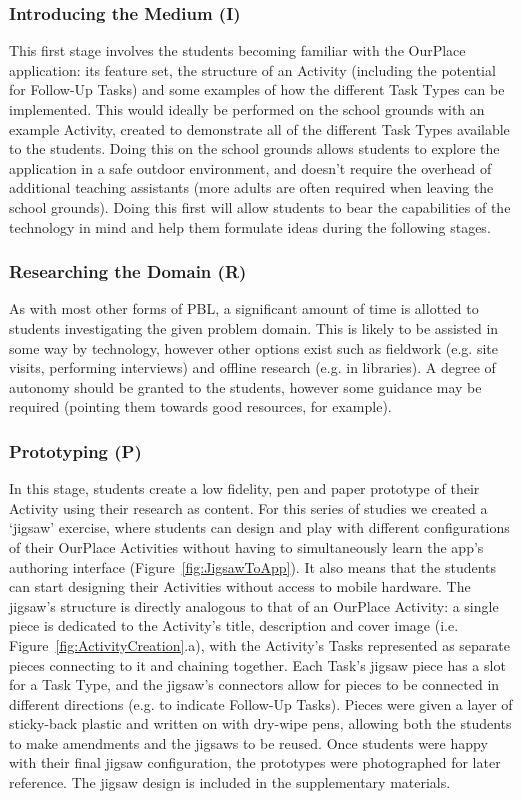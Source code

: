 \documentclass[,hyphens]{sigchi}
\begin{document}
\subsubsection{Introducing the Medium (I)}
This first stage involves the students becoming familiar with the OurPlace application: its feature set, the structure of an Activity (including the potential for Follow-Up Tasks) and some examples of how the different Task Types can be implemented. This would ideally be performed on the school grounds with an example Activity, created to demonstrate all of the different Task Types available to the students. Doing this on the school grounds allows students to explore the application in a safe outdoor environment, and doesn't require the overhead of additional teaching assistants (more adults are often required when leaving the school grounds). Doing this first will allow students to bear the capabilities of the technology in mind and help them formulate ideas during the following stages.

\subsubsection{Researching the Domain (R)}
As with most other forms of PBL, a significant amount of time is allotted to students investigating the given problem domain. This is likely to be assisted in some way by technology, however other options exist such as fieldwork (e.g. site visits, performing interviews) and offline research (e.g. in libraries). A degree of autonomy should be granted to the students, however some guidance may be required (pointing them towards good resources, for example).

\subsubsection{Prototyping (P)}
In this stage, students create a low fidelity, pen and paper prototype of their Activity using their research as content. For this series of studies we created a `jigsaw' exercise, where students can design and play with different configurations of their OurPlace Activities without having to simultaneously learn the app's authoring interface (Figure~\ref{fig:JigsawToApp}). It also means that the students can start designing their Activities without access to mobile hardware. The jigsaw's structure is directly analogous to that of an OurPlace Activity: a single piece is dedicated to the Activity's title, description and cover image (i.e. Figure~\ref{fig:ActivityCreation}.a), with the Activity's Tasks represented as separate pieces connecting to it and chaining together. Each Task's jigsaw piece has a slot for a Task Type, and the jigsaw's connectors allow for pieces to be connected in different directions (e.g. to indicate Follow-Up Tasks). Pieces were given a layer of sticky-back plastic and written on with dry-wipe pens, allowing  both the students to make amendments and the jigsaws to be reused. Once students were happy with their final jigsaw configuration, the prototypes were photographed for later reference. The jigsaw design is included in the supplementary materials.
\end{document}

